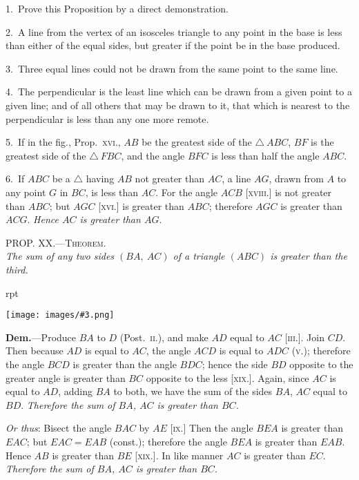 \documentclass[oneside]{book}
\newcounter{wrapwidth}
\newcommand\myprop[2]{
\bigskip\Needspace*{4\baselineskip}\begin{center}\textsc{#1}\\\medskip\emph{#2}\par\end{center}
}
\newcommand\imgflow[3]{
\setcounter{wrapwidth}{#1}
\begin{wrapfigure}[#2]{r}{\value{wrapwidth}pt}
\begin{center}
\vspace{-0.3in}
\texttt{[image: images/\#3.png]}
\end{center}
\end{wrapfigure}
}
\begin{document}
\begin{footnotesize}
1.~Prove this Proposition by a direct demonstration.

2.~A line from the vertex of an isosceles triangle to any point
in the base is less than either of the equal sides, but greater if the
point be in the base produced.

3.~Three equal lines could not be drawn from the same point
to the same line.

4.~The perpendicular is the least line which can be drawn from
a given point to a given line; and of all others that may be
drawn to it, that which is nearest to the perpendicular is less
than any one more remote.

5.~If in the fig., Prop.~\textsc{xvi}., $AB$ be the greatest side of the
$\triangle~ABC$, $BF$ is the greatest side of the $\triangle~FBC$, and the angle $BFC$
is less than half the angle $ABC$.

6.~If $ABC$ be a $\triangle$ having $AB$ not greater than $AC$, a line $AG$,
drawn from $A$ to any point $G$ in $BC$, is less than $AC$. For the
angle $ACB$ [\textsc{xviii}.] is not greater than $ABC$; but $AGC$ [\textsc{xvi}.] is
greater than $ABC$; therefore $AGC$ is greater than $ACG$. \emph{Hence
$AC$ is greater than $AG$}.
\par\end{footnotesize}


\myprop{PROP\@. XX\@.---Theorem.}{The sum of any two sides $(BA,\ AC)$ of a triangle $(ABC)$
is greater than the third.}

\imgflow{150}{10}{f036}

\textbf{Dem.}---Produce $BA$ to $D$ (Post.~\textsc{ii}.), and make $AD$
equal to $AC$ [\textsc{iii}.]. Join
$CD$. Then because $AD$ is
equal to $AC$, the angle
$ACD$ is equal to $ADC$ (\textsc{v}.);
therefore the angle $BCD$
is greater than the angle
$BDC$; hence the side $BD$
opposite to the greater angle
is greater than $BC$ opposite
to the less [\textsc{xix}.]. Again,
since $AC$ is equal to $AD$,
adding $BA$ to both, we have the sum of the sides $BA$,
$AC$ equal to $BD$. \emph{Therefore the sum of $BA$, $AC$ is
greater than $BC$.}

\begin{footnotesize}
\emph{Or thus}: Bisect the angle $BAC$ by $AE$ [\textsc{ix}.] Then the angle
$BEA$ is greater than $EAC$; but $EAC = EAB$ (const.); therefore
the angle $BEA$ is greater than $EAB$. Hence $AB$ is greater than
$BE$ [\textsc{xix}.]. In like manner $AC$ is greater than $EC$. \emph{Therefore
the sum of $BA$, $AC$ is greater than $BC$.}
\par\end{footnotesize}
\end{document}
